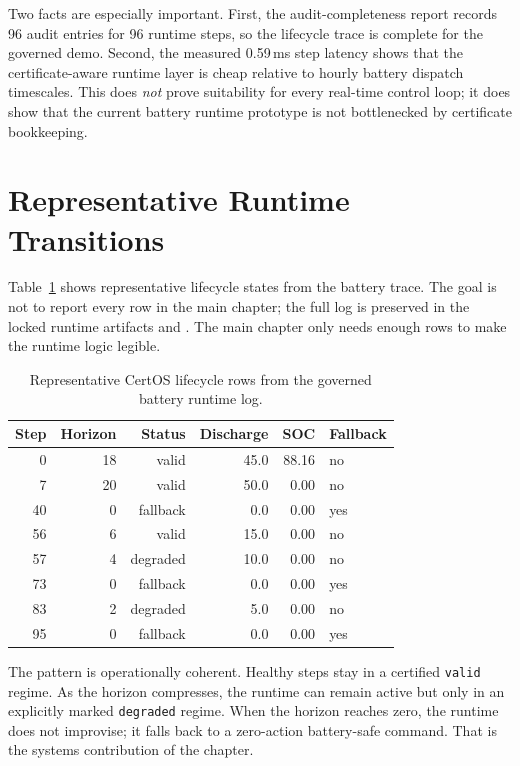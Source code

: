 Two facts are especially important.  First, the audit-completeness report
records 96 audit entries for 96 runtime steps, so the lifecycle trace is
complete for the governed demo.  Second, the measured 0.59\,ms step latency
shows that the certificate-aware runtime layer is cheap relative to hourly
battery dispatch timescales.  This does \emph{not} prove suitability for
every real-time control loop; it does show that the current battery runtime
prototype is not bottlenecked by certificate bookkeeping.

\section{Representative Runtime Transitions}

Table~\ref{tab:certos-representative-rows} shows representative lifecycle
states from the battery trace.  The goal is not to report every row in the
main chapter; the full log is preserved in the locked runtime artifacts
 and
. The main chapter only needs
enough rows to make the runtime logic legible.

\begin{table}[ht]
\centering
\caption{Representative CertOS lifecycle rows from the governed battery
runtime log.}
\label{tab:certos-representative-rows}
\begin{tabular}{rrrrrl}
\toprule
\textbf{Step} & \textbf{Horizon} & \textbf{Status} & \textbf{Discharge} &
\textbf{SOC} & \textbf{Fallback} \\
\midrule
0  & 18 & valid    & 45.0 & 88.16 & no \\
7  & 20 & valid    & 50.0 & 0.00  & no \\
40 & 0  & fallback & 0.0  & 0.00  & yes \\
56 & 6  & valid    & 15.0 & 0.00  & no \\
57 & 4  & degraded & 10.0 & 0.00  & no \\
73 & 0  & fallback & 0.0  & 0.00  & yes \\
83 & 2  & degraded & 5.0  & 0.00  & no \\
95 & 0  & fallback & 0.0  & 0.00  & yes \\
\bottomrule
\end{tabular}
\end{table}

The pattern is operationally coherent.  Healthy steps stay in a certified
\texttt{valid} regime.  As the horizon compresses, the runtime can remain
active but only in an explicitly marked \texttt{degraded} regime.  When the
horizon reaches zero, the runtime does not improvise; it falls back to a
zero-action battery-safe command.  That is the systems contribution of the
chapter.

